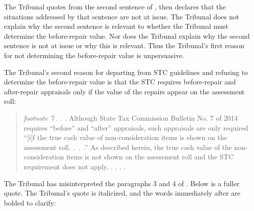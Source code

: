 \documentclass[12pt,\documentclassflag]{michiganCourtOfAppealsBrief}
\begin{document}
The Tribunal quotes from the second sentence of \mathieuGast, then declares that the situations addressed by that sentence are not at issue. %
The Tribunal does not explain why the second sentence is relevant to whether the Tribunal must determine the before-repair value. Nor does the Tribunal explain why the second sentence is not at issue or why this is relevant.
Thus the Tribunal's first reason for not determining the before-repair value is unpersuasive. %

The Tribunal's second reason for departing from STC guidelines and refusing to determine the before-repair value is that the STC requires before-repair and after-repair appraisals only if the value of the repairs appear on the assessment roll:

\begin{quote}
  {\em footnote 7} . . .  Although State Tax Commission Bulletin No. 7 of 2014 requires ``before'' and ``after'' appraisals, such appraisals are only required ``[i]f the true cash value of non-consideration items is shown on the assessment roll. .~.~.'' As described herein, the true cash value of the non-consideration items is not shown on the assessment roll and the STC requirement does not apply. . . . \reconsiderationDenied[2].
\end{quote}

The Tribunal has misinterpreted the paragraphs 3 and 4 of . Below is a fuller quote. The Tribunal's quote is italicized, and the words immediately after are bolded to clarify:
\end{document}

